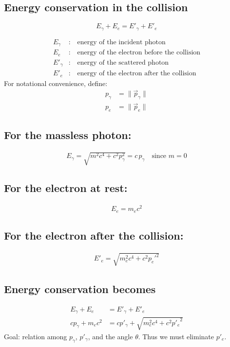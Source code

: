 \subsection{Energy conservation in the collision}
\[
E_\gamma + E_e = E'_\gamma + E'_e
\]

\begin{align*}
	E_\gamma &: \quad \text{energy of the incident photon} \\
	E_e       &: \quad \text{energy of the electron before the collision} \\
	E'_\gamma &: \quad \text{energy of the scattered photon} \\
	E'_e      &: \quad \text{energy of the electron after the collision}
\end{align*}
For notational convenience, define:
\begin{align*}
	p_\gamma &= \lVert \overrightarrow{p}_\gamma\rVert\\
	p_e &= \lVert \overrightarrow{p}_e\rVert
\end{align*}

\subsection{For the massless photon:}
\begin{align*}
	E_\gamma = \sqrt{m^2c^4 + c^2 p_\gamma^2} = c\,p_\gamma \quad \text{since } m=0
\end{align*}

\subsection{For the electron at rest:}
\begin{align*}
	E_e = m_e c^2
\end{align*}

\subsection{For the electron after the collision:}
\begin{align*}
	E'_e = \sqrt{m_e^2 c^4 + c^2 p_e'^2}
\end{align*}

\subsection{Energy conservation becomes}
\begin{align}
	E_\gamma + E_e &= E'_\gamma + E'_e \nonumber\\
	c p_\gamma + m_e c^2 &= c p'_\gamma + \sqrt{m_e^2 c^4 + c^2 {p'_e}^2} \label{Energie}
\end{align}
Goal: relation among $p_\gamma$, $p'_\gamma$, and the angle $\theta$. Thus we must eliminate $p'_e$.\\

